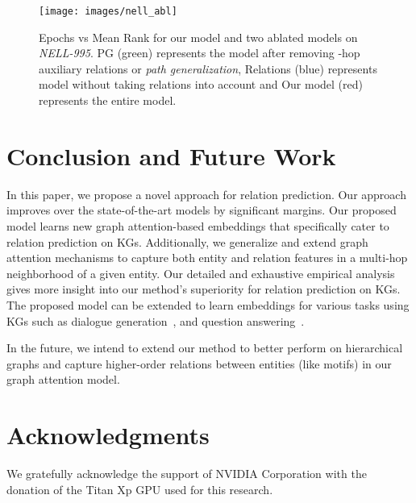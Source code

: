 \documentclass[11pt,a4paper]{article}
\begin{document}
\begin{figure}[h]
\centering
  \texttt{[image: images/nell\_abl]}
  \caption{Epochs vs Mean Rank for our model and two ablated models on \emph{NELL-995}. PG (green) represents the model after removing -hop auxiliary relations or \emph{path generalization}, Relations (blue) represents model without taking relations into account and Our model (red) represents the entire model.}
  \label{fig:abl}
\end{figure}
\section{Conclusion and Future Work}\label{conclusion}
\label{ssec:conclusion}
In this paper, we propose a novel approach for relation prediction. Our approach improves over the state-of-the-art models by significant margins. 
Our proposed model learns new graph attention-based embeddings that specifically cater to relation prediction on KGs. Additionally, we generalize and extend graph attention mechanisms to capture both entity and relation features in a multi-hop neighborhood of a given entity. Our detailed and exhaustive empirical analysis gives more insight into our method's superiority for relation prediction on KGs. The proposed model can be extended to learn embeddings for various tasks using KGs such as dialogue generation~\cite{Hehe2017, keizer2017}, and question answering~\cite{zhang2016question,diefenbach2018wdaqua}.


In the future, we intend to extend our method to better perform on hierarchical graphs and capture higher-order relations between entities (like motifs) in our graph attention model.



\section*{Acknowledgments}

We gratefully acknowledge the support of NVIDIA Corporation with the donation of the Titan Xp GPU used for this research. \\
\end{document}
